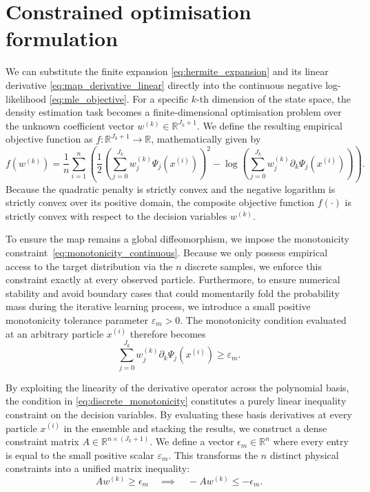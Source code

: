 \section{Constrained optimisation formulation} \label{sec:constrained_optimisation}

We can substitute the finite expansion \eqref{eq:hermite_expansion} and its linear derivative \eqref{eq:map_derivative_linear} directly into the continuous negative log-likelihood \eqref{eq:mle_objective}. For a specific $k$-th dimension of the state space, the density estimation task becomes a finite-dimensional optimisation problem over the unknown coefficient vector $w^{(k)} \in \mathbb{R}^{J_k+1}$. We define the resulting empirical objective function as $f:\mathbb{R}^{J_k+1} \rightarrow \mathbb{R}$, mathematically given by
\begin{equation}
    f(w^{(k)}) = \frac{1}{n} \sum_{i=1}^n \left( \frac{1}{2} \left( \sum_{j=0}^{J_k} w_j^{(k)} \Psi_j(x^{(i)}) \right)^2 - \log \left( \sum_{j=0}^{J_k} w_j^{(k)} \partial_k \Psi_j(x^{(i)}) \right) \right).
    \label{eq:finite_objective}
\end{equation}
Because the quadratic penalty is strictly convex and the negative logarithm is strictly convex over its positive domain, the composite objective function $f(\cdot)$ is strictly convex with respect to the decision variables $w^{(k)}$.

To ensure the map remains a global diffeomorphism, we impose the monotonicity constraint~\eqref{eq:monotonicity_continuous}. Because we only possess empirical access to the target distribution via the $n$ discrete samples, we enforce this constraint exactly at every observed particle. Furthermore, to ensure numerical stability and avoid boundary cases that could momentarily fold the probability mass during the iterative learning process, we introduce a small positive monotonicity tolerance parameter $\varepsilon_m > 0$. The monotonicity condition evaluated at an arbitrary particle $x^{(i)}$ therefore becomes
\begin{equation}
    \sum_{j=0}^{J_k} w_j^{(k)} \partial_k \Psi_j(x^{(i)}) \ge \varepsilon_m.
    \label{eq:discrete_monotonicity}
\end{equation}

By exploiting the linearity of the derivative operator across the polynomial basis, the condition in \eqref{eq:discrete_monotonicity} constitutes a purely linear inequality constraint on the decision variables. By evaluating these basis derivatives at every particle $x^{(i)}$ in the ensemble and stacking the results, we construct a dense constraint matrix $A \in \mathbb{R}^{n \times (J_k+1)}$. We define a vector $\epsilon_m \in \mathbb{R}^n$ where every entry is equal to the small positive scalar $\varepsilon_m$. This transforms the $n$ distinct physical constraints into a unified matrix inequality:
\begin{equation*}
    A w^{(k)} \ge \epsilon_m \quad \implies \quad -A w^{(k)} \le -\epsilon_m.
    \label{eq:matrix_inequality}
\end{equation*}


